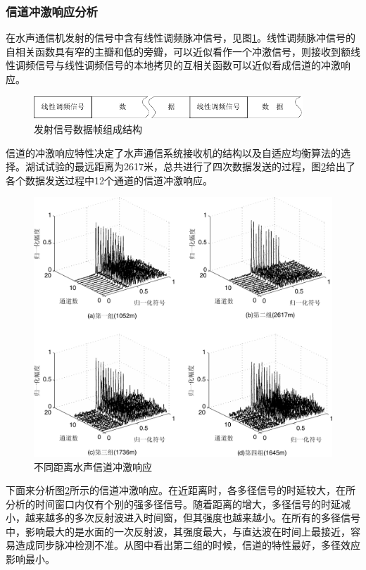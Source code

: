 \subsubsection*{信道冲激响应分析}
在水声通信机发射的信号中含有线性调频脉冲信号，见图\ref{fig:6.6}。线性调频脉冲信号的自相关函数具有窄的主瓣和低的旁瓣，可以近似看作一个冲激信号，则接收到额线性调频信号与线性调频信号的本地拷贝的互相关函数可以近似看成信道的冲激响应。
\begin{figure}[htb]
  \begin{center}
    \includegraphics[width=0.9\textwidth]{images/frame.pdf}
  \end{center}
  \caption{发射信号数据帧组成结构}
  \label{fig:6.6}
\end{figure}
信道的冲激响应特性决定了水声通信系统接收机的结构以及自适应均衡算法的选择。湖试试验的最远距离为2617米，总共进行了四次数据发送的过程，图\ref{fig:6.7}给出了各个数据发送过程中12个通道的信道冲激响应。
\begin{figure}[htb]
  \begin{center}
    \includegraphics[width=\textwidth]{images/channelpulse.pdf}
  \end{center}
  \caption{不同距离水声信道冲激响应}
  \label{fig:6.7}
\end{figure}

下面来分析图\ref{fig:6.7}所示的信道冲激响应。在近距离时，各多径信号的时延较大，在所分析的时间窗口内仅有个别的强多径信号。随着距离的增大，多径信号的时延减小，越来越多的多次反射波进入时间窗，但其强度也越来越小。在所有的多径信号中，影响最大的是水面的一次反射波，其强度最大，与直达波在时间上最接近，容易造成同步脉冲检测不准。从图中看出第二组的时候，信道的特性最好，多径效应影响最小。

